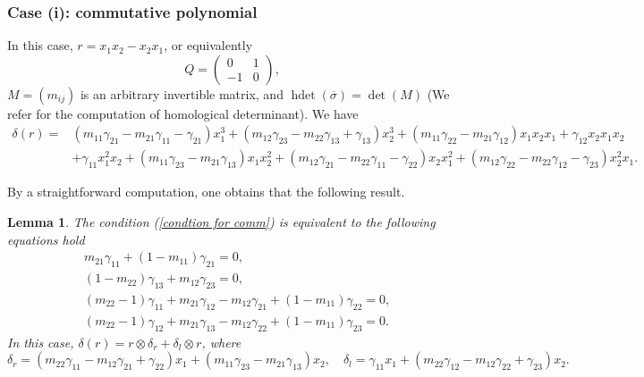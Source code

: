 \documentclass[a4paper,10pt]{amsart}
\newtheorem{lemma}[theorem]{Lemma}
\theoremstyle{definition}
\numberwithin{equation}{section}
\DeclareMathOperator{\hdet}{hdet}
\begin{document}
\subsubsection{Case (i): commutative polynomial} In this case, $r=x_1x_2-x_2x_1$, or equivalently
$$Q=\left(
\begin{array}{cc}
0 & 1\\
-1  &  0
\end{array}
\right),$$
$M=(m_{ij})$ is an arbitrary invertible matrix, and $\hdet(\overline{\sigma})=\det (M)$ (We refer \cite{JZ,SZL} for the computation of homological determinant). We have
\begin{align*}
\delta(r)=&(m_{11}\gamma_{21}-m_{21}\gamma_{11}-\gamma_{21})x_1^3+(m_{12}\gamma_{23}-m_{22}\gamma_{13}+\gamma_{13})x_2^3+(m_{11}\gamma_{22}-m_{21}\gamma_{12})x_1x_2x_1+\gamma_{12}x_2x_1x_2\\
&+\gamma_{11}x_1^2x_2+(m_{11}\gamma_{23}-m_{21}\gamma_{13})x_1x_2^2+(m_{12}\gamma_{21}-m_{22}\gamma_{11}-\gamma_{22})x_2x_1^2+(m_{12}\gamma_{22}-m_{22}\gamma_{12}-\gamma_{23})x_2^2x_1.
\end{align*}

By a straightforward computation, one obtains that the following result.
\begin{lemma}
The condition (\ref{condtion for comm}) is equivalent to the following equations hold
\begin{equation}\label{equation for comm}
\begin{aligned}
&m_{21}\gamma_{11}+(1-m_{11})\gamma_{21}=0,\\
&(1-m_{22})\gamma_{13}+m_{12}\gamma_{23}=0,\\
&(m_{22}-1)\gamma_{11}+m_{21}\gamma_{12}-m_{12}\gamma_{21}+(1-m_{11})\gamma_{22}=0,\\
&(m_{22}-1)\gamma_{12}+m_{21}\gamma_{13}-m_{12}\gamma_{22}+(1-m_{11})\gamma_{23}=0.
\end{aligned}
\end{equation}
In this case, $\delta(r)=r\otimes \delta_r+\delta_l\otimes r$, where
\begin{equation*}\label{delta_l,r for comm}
\delta_{r}=(m_{22}\gamma_{11}-m_{12}\gamma_{21}+\gamma_{22})x_1+(m_{11}\gamma_{23}-m_{21}\gamma_{13})x_2,\quad
\delta_{l}=\gamma_{11}x_1+(m_{22}\gamma_{12}-m_{12}\gamma_{22}+\gamma_{23})x_2.
\end{equation*}
\end{lemma}
\end{document}
